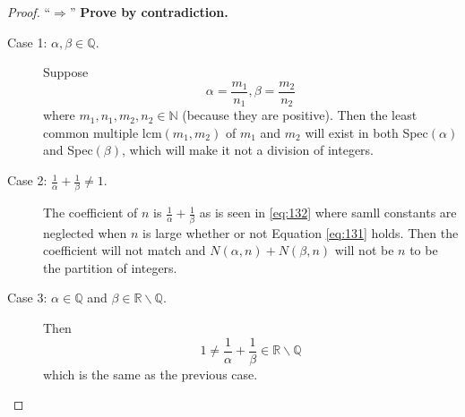 \documentclass[a4paper,12pt]{article}
\theoremstyle{definition}
\newenvironment{problems}{\begin{list}{}{\renewcommand{\makelabel}[1]{\textbf{##1}\hfil}}}{\end{list}}
\begin{document}
\begin{problems}
\begin{proof}
        ``$\Rightarrow$''
        \textbf{Prove by contradiction.}
        \begin{description}
            \item[Case 1: $\alpha,\beta\in \mathbb{Q}$.] Suppose
            \begin{equation*}
                \alpha = \frac{m_1}{n_1}, \beta = \frac{m_2}{n_2}
            \end{equation*}
            where $m_1,n_1,m_2,n_2\in\mathbb{N}$ (because they are positive). Then the least common multiple lcm$(m_1,m_2)$ of $m_1$ and $m_2$ will exist in both Spec$(\alpha)$ and Spec$(\beta)$, which will make it not a division of integers.
            \item[Case 2: $\frac{1}{\alpha} + \frac{1}{\beta}\neq 1$.] The coefficient of $n$ is $\frac{1}{\alpha} + \frac{1}{\beta}$ as is seen in \eqref{eq:132} where samll constants are neglected when $n$ is large whether or not Equation \eqref{eq:131} holds. Then the coefficient will not match and $N(\alpha,n)+N(\beta, n)$ will not be $n$ to be the partition of integers.
            \item[Case 3: $\alpha\in \mathbb{Q}$ and $\beta\in \mathbb{R}\backslash\mathbb{Q}$.] Then 
            \begin{equation*}
                1\neq \frac{1}{\alpha} + \frac{1}{\beta} \in \mathbb{R}\backslash\mathbb{Q}
            \end{equation*} 
            which is the same as the previous case.
        \end{description}
    \end{proof} 
\end{problems}
\end{document}
